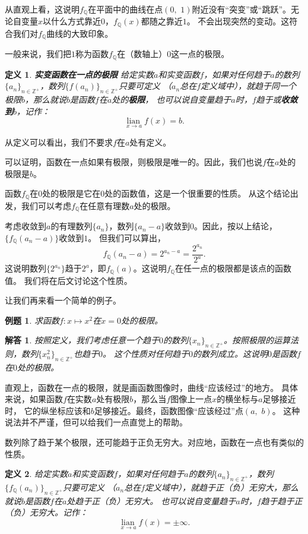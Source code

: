 \documentclass[12pt,UTF8]{ctexbook}
\newcommand{\lian}[1]{
    \underset{#1}{\operatorname{lian}\,}
}
\newtheorem{df}{定义}[section]
\newtheorem{et}{例题}[section]
\newtheorem*{so}{解答}
\begin{document}
从直观上看，这说明$f_{\mathbb{Q}}$在平面中的曲线在点$(0,\,\,1)$附近没有“突变”或“跳跃”。无论自变量$x$以什么方式靠近$0$，$f_{\mathbb{Q}}(x)$都随之靠近$1$。
不会出现突然的变动。这符合我们对$f_{\mathbb{Q}}$曲线的大致印象。

一般来说，我们把$1$称为函数$f_{\mathbb{Q}}$在（数轴上）$0$这一点的极限。
\begin{df}\textbf{实变函数在一点的极限}
    给定实数$a$和实变函数$f$，如果对任何趋于$a$的数列$\{a_n\}_{n\in\mathbb{Z}^+}$，数列$\{f(a_n)\}_{n\in\mathbb{Z}^+}$只要可定义
    （$a_n$总在$f$定义域中），就趋于同一个极限$b$，那么就说$b$是函数$f$在$a$处的\textbf{极限}，
    也可以说自变量趋于$a$时，$f$趋于或\textbf{收敛到}$b$，记作：
    $$  \lian{x \to a} f(x) = b. $$
\end{df}

从定义可以看出，我们不要求$f$在$a$处有定义。

可以证明，函数在一点如果有极限，则极限是唯一的。因此，我们也说$f$在$a$处的极限是$b$。

函数$f_{\mathbb{Q}}$在$0$处的极限是它在$0$处的函数值，这是一个很重要的性质。
从这个结论出发，我们可以考虑$f_{\mathbb{Q}}$在任意有理数$a$处的极限。

考虑收敛到$a$的有理数列$\{a_n\}$，数列$\{a_n - a\}$收敛到$0$。因此，按以上结论，$\{f_{\mathbb{Q}}(a_n - a)\}$收敛到$1$。
但我们可以算出，
$$f_{\mathbb{Q}}(a_n - a) = 2^{a_n - a} = \frac{2^{a_n}}{2^a}. $$
这说明数列$\{2^{a_n}\}$趋于$2^a$，即$f_{\mathbb{Q}}(a)$。这说明$f_{\mathbb{Q}}$在任一点的极限都是该点的函数值。
我们将在后文讨论这个性质。

让我们再来看一个简单的例子。
\begin{et}
    求函数$f:x\mapsto x^2$在$x=0$处的极限。
\end{et}
\begin{so}
    按照定义，我们考虑任意一个趋于$0$的数列$\{x_n\}_{n\in\mathbb{Z}^+}$。按照极限的运算法则，数列$\{x_n^2\}_{n\in\mathbb{Z}^+}$也趋于$0$。
    这个性质对任何趋于$0$的数列成立。这说明$0$是函数$f$在$0$处的极限。
\end{so}

直观上，函数在一点的极限，就是画函数图像时，曲线“应该经过”的地方。
具体来说，如果函数$f$在实数$a$处有极限$b$，那么当$f$图像上一点$x$的横坐标与$a$足够接近时，
它的纵坐标应该和$b$足够接近。最终，函数图像“应该经过”点$(a,\,\, b)$。
这种说法并不严谨，但可以给我们一点直觉上的帮助。

数列除了趋于某个极限，还可能趋于正负无穷大。对应地，函数在一点也有类似的性质。
\begin{df}
    给定实数$a$和实变函数$f$，如果对任何趋于$a$的数列$\{a_n\}_{n\in\mathbb{Z}^+}$，数列$\{f_{\mathbb{Q}}(a_n)\}_{n\in\mathbb{Z}^+}$只要可定义
    （$a_n$总在$f$定义域中），就趋于正（负）无穷大，那么就说$b$是函数$f$在$a$处趋于正（负）无穷大。
    也可以说自变量趋于$a$时，$f$趋于趋于正（负）无穷大。记作：
    $$  \lian{x \to a} f(x) = \pm\infty. $$
\end{df}
\end{document}

